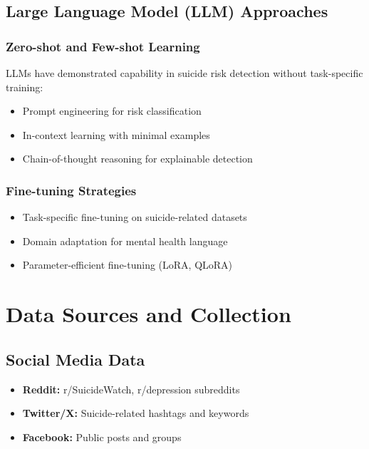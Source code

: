\documentclass[12pt,a4paper]{article}
\begin{document}
\subsection{Large Language Model (LLM) Approaches}

\subsubsection{Zero-shot and Few-shot Learning}
LLMs have demonstrated capability in suicide risk detection without task-specific training:
\begin{itemize}
    \item Prompt engineering for risk classification
    \item In-context learning with minimal examples
    \item Chain-of-thought reasoning for explainable detection
\end{itemize}

\subsubsection{Fine-tuning Strategies}
\begin{itemize}
    \item Task-specific fine-tuning on suicide-related datasets
    \item Domain adaptation for mental health language
    \item Parameter-efficient fine-tuning (LoRA, QLoRA)
\end{itemize}

\section{Data Sources and Collection}

\subsection{Social Media Data}
\begin{itemize}
    \item \textbf{Reddit:} r/SuicideWatch, r/depression subreddits
    \item \textbf{Twitter/X:} Suicide-related hashtags and keywords
    \item \textbf{Facebook:} Public posts and groups
\end{itemize}
\end{document}

